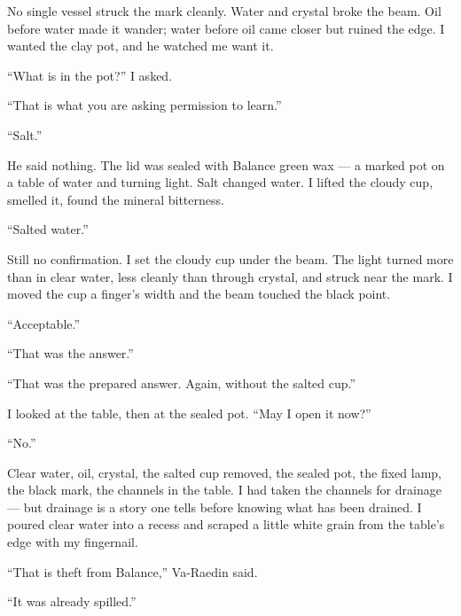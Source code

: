 No single vessel struck the mark cleanly. Water and crystal broke the beam. Oil before water made it wander; water before oil came closer but ruined the edge. I wanted the clay pot, and he watched me want it.\par

``What is in the pot?'' I asked.\par

``That is what you are asking permission to learn.''\par

``Salt.''\par

He said nothing. The lid was sealed with Balance green wax --- a marked pot on a table of water and turning light. Salt changed water. I lifted the cloudy cup, smelled it, found the mineral bitterness.\par

``Salted water.''\par

Still no confirmation. I set the cloudy cup under the beam. The light turned more than in clear water, less cleanly than through crystal, and struck near the mark. I moved the cup a finger's width and the beam touched the black point.\par

``Acceptable.''\par

``That was the answer.''\par

``That was the prepared answer. Again, without the salted cup.''\par

I looked at the table, then at the sealed pot. ``May I open it now?''\par

``No.''\par

Clear water, oil, crystal, the salted cup removed, the sealed pot, the fixed lamp, the black mark, the channels in the table. I had taken the channels for drainage --- but drainage is a story one tells before knowing what has been drained. I poured clear water into a recess and scraped a little white grain from the table's edge with my fingernail.\par

``That is theft from Balance,'' Va-Raedin said.\par

``It was already spilled.''\par


